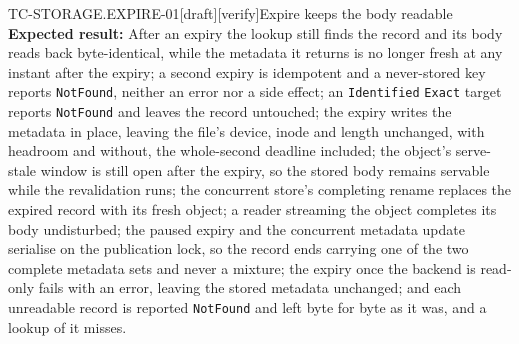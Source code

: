 \begin{requirement}{TC-STORAGE.EXPIRE-01}[draft][verify]{Expire keeps the body readable}
  \textbf{Expected result:} After an expiry the lookup still finds the record
  and its body reads back byte-identical, while the metadata it returns is no
  longer fresh at any instant after the expiry; a second expiry is
  idempotent and a never-stored key reports \texttt{NotFound}, neither an error
  nor a side effect; an \texttt{Identified} \texttt{Exact} target reports
  \texttt{NotFound} and leaves the record untouched; the expiry writes the
  metadata in place, leaving the file's device, inode and length unchanged,
  with headroom and without, the whole-second deadline included; the
  object's serve-stale window is still open after the expiry, so the stored
  body remains servable while the revalidation runs; the concurrent store's
  completing rename replaces the expired record with its fresh object; a
  reader streaming the object completes its body undisturbed; the paused
  expiry and the concurrent metadata update serialise on the publication
  lock, so the record ends carrying one of the two complete metadata sets
  and never a mixture;
  the expiry once the backend is read-only fails with an error, leaving the
  stored metadata unchanged; and each unreadable record is reported
  \texttt{NotFound} and left byte for byte as it was, and a lookup of it
  misses.



\end{requirement}

